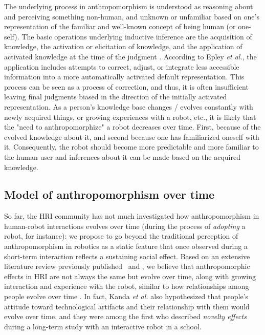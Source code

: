 \documentclass{acm_proc_article-sp}
\begin{document}
The underlying process in anthropomorphism is understood as reasoning about and
perceiving something non-human, and unknown or unfamiliar based on one's
representation of the familiar and well-known concept of being human (or
one-self). The basic operations underlying inductive inference are the
acquisition of knowledge, the activation or elicitation of knowledge, and the
application of activated knowledge at the time of the judgment
\cite{epley_when_2008}. According to Epley \textit{et al.}, the application
includes attempts to correct, adjust, or integrate less accessible information
into a more automatically activated default representation. This process can be
seen as a process of correction, and thus, it is often insufficient leaving
final judgments biased in the direction of the initially activated
representation. As a person's knowledge base changes / evolves constantly with
newly acquired things, or growing experiences with a robot, etc., it is likely
that the "need to anthropomorphize" a robot decreases over time. First, because
of the evolved knowledge about it, and second because one has familiarized
oneself with it.  Consequently, the robot should become more predictable and
more familiar to the human user and inferences about it can be made based on
the acquired knowledge.  


\subsection{Model of anthropomorphism over time}
\label{sec:modelintro}

So far, the HRI community has not much investigated how anthropomorphism in
human-robot interactions evolves over time (during the process of
\emph{adopting} a robot, for instance): we propose to go beyond the traditional
perception of anthropomorphism in robotics as a static feature that once
observed during a short-term interaction reflects a sustaining social effect.
Based on an extensive literature review previously
published~\cite{fink_anthropomorphism_2012} and 
, we believe that
anthropomorphic effects in HRI are not always the same but evolve over time,
along with growing interaction and experience with the robot, similar to how
relationships among people evolve over time . In
fact, Kanda \textit{et al.} \cite{kanda_interactive_2004} also hypothesized
that people's attitude toward technological artifacts and their relationship
with them would evolve over time, and they were among the first who described
\textit{novelty effects} during a long-term study with an interactive robot in
a school.
\end{document}
